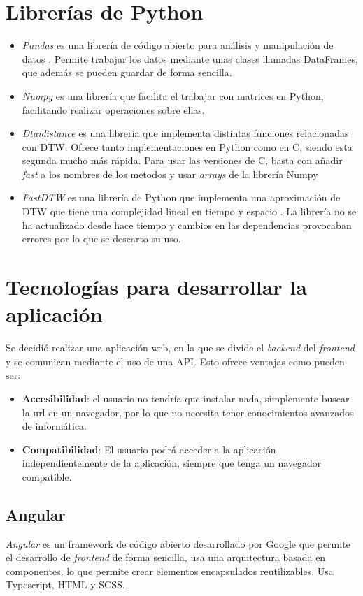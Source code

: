 \section{Librerías de Python}
\begin{itemize}
\item \textit{Pandas} es una librería de código abierto para análisis y manipulación de datos \cite{pandas}.  Permite trabajar los datos mediante unas clases llamadas DataFrames, que además se pueden guardar de forma sencilla.

\item \textit{Numpy} es una librería que facilita el trabajar con matrices en Python, facilitando realizar operaciones sobre ellas.

\item \textit{Dtaidistance} es una librería que implementa distintas funciones relacionadas con DTW. Ofrece tanto implementaciones en Python como en C, siendo esta segunda mucho más rápida. Para usar las versiones de C, basta con añadir \textit{fast} a los nombres de los metodos y usar \textit{arrays} de la librería Numpy

\item \textit{FastDTW} es una librería de Python  que implementa una aproximación de DTW que tiene una complejidad lineal en tiempo y espacio \cite{Salvador2004FastDTWTA}.
La librería no se ha actualizado desde hace tiempo y cambios en las dependencias provocaban errores por lo que se descarto su uso.
\end{itemize}

\section {Tecnologías para desarrollar la aplicación}
Se decidió realizar una aplicación web, en la que se divide el \textit{backend} del \textit{frontend} y se comunican mediante el uso de una API. Esto ofrece ventajas como pueden ser:
\begin{itemize}
	\item  \textbf{Accesibilidad}: el usuario no tendría que instalar nada,  simplemente buscar la url en un navegador, por lo que no necesita tener conocimientos avanzados de informática.
	\item \textbf{Compatibilidad}: El usuario podrá acceder a la aplicación  independientemente de la aplicación, siempre que tenga un navegador compatible.
\end{itemize}

\subsection{Angular}
\textit{Angular} es un framework de código abierto desarrollado por Google que permite el desarrollo de \textit{frontend} de forma sencilla, usa una arquitectura basada en componentes, lo que  permite crear elementos encapsulados reutilizables. Usa Typescript,  HTML y SCSS.

